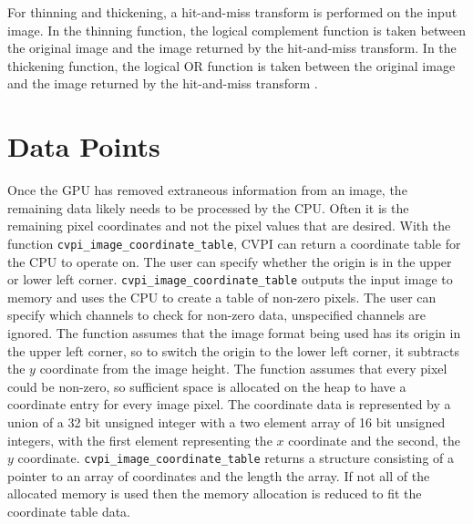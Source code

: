\documentclass[12pt]{report}
\begin{document}
For thinning and thickening, a hit-and-miss transform is performed on
the input image. In the thinning function, the logical complement
function is taken between the original image and the image returned by
the hit-and-miss transform. In the thickening function, the logical OR
function is taken between the original image and the image returned by
the hit-and-miss transform \cite[Morphology]{HIPR2}.

\section{Data Points}
\label{sec-3-14}
Once the GPU has removed extraneous information from an image, the
remaining data likely needs to be processed by the CPU. Often it is
the remaining pixel coordinates and not the pixel values that are
desired. With the function {\tt cvpi\_image\_coordinate\_table},
CVPI can return a coordinate table for the CPU to operate on.  The
user can specify whether the origin is in the upper or
lower left corner. {\tt cvpi\_image\_coordinate\_table} outputs the
input image to memory and uses the CPU to create a table of non-zero
pixels. The user can specify which channels to check for non-zero
data, unspecified channels are ignored.  The function assumes that the
image format being used has its origin in the upper left corner, so to
switch the origin to the lower left corner, it subtracts the $y$
coordinate from the image height. The function assumes that every
pixel could be non-zero, so sufficient space is allocated on the
heap to have a coordinate entry for every image pixel. The coordinate
data is represented by a union of a 32 bit unsigned integer with a two
element array of 16 bit unsigned integers, with the first element
representing the $x$ coordinate and the second, the $y$
coordinate. {\tt cvpi\_image\_coordinate\_table} returns a structure
consisting of a pointer to an array of coordinates and the length the
array. If not all of the allocated memory is used then the memory
allocation is reduced to fit the coordinate table data.
\end{document}
